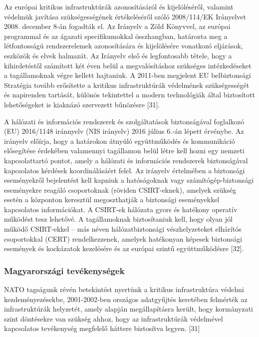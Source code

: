 \documentclass[12pt,magyar,a4paper,oneside]{scrreprt}
\begin{document}
Az európai kritikus infrastruktúrák azonosításáról és kijelöléséről,
valamint védelmük javítása szükségességének értékeléséről szóló
2008/114/EK Irányelvet 2008. december 8-án fogadták el. Az Irányelv a
Zöld Könyvvel, az európai programmal és az ágazati specifikumokkal
összhangban, határozta meg a létfontosságú rendszerelemek azonosítására
és kijelölésére vonatkozó eljárások, eszközök és elvek halmazát. Az
Irányelv első és legfontosabb tétele, hogy a kihirdetéstől számított két
éven belül a megvalósításhoz szükséges intézkedéseket a tagállamoknak
végre kellett hajtaniuk. A 2011-ben megjelent EU belbiztonsági Stratégia
tovább erősítette a kritikus infrastruktúrák védelmének szükségességét
és napirenden tartását, különös tekintettel a modern technológiák által
biztosított lehetőségeket is kiaknázó szervezett bűnözésre {[}31{]}.

A hálózati és információs rendszerek és szolgáltatások biztonságával
foglalkozó (EU) 2016/1148 iránnyelv (NIS irányelv) 2016 július 6.-án
lépett érvénybe. Az irányelv előírja, hogy a határokon átnyúló
együttműködés és kommunikáció elősegítése érdekében valamennyi
tagállamon belül létre kell hozni egy nemzeti kapcsolattartó pontot,
amely a hálózati és információs rendszerek biztonságával kapcsolatos
kérdések koordinálásáért felel. Az irányelv értelmében a biztonsági
eseményekről bejelentést kell kapniuk a hatóságoknak vagy
számítógép-biztonsági eseményekre reagáló csoportoknak (röviden
CSIRT-eknek), amelyek szükség esetén a központon keresztül megoszthatják
a biztonsági eseményekkel kapcsolatos információkat. A CSIRT-ek hálózata
gyors és hatékony operatív működést tesz lehetővé. A tagállamoknak
biztosítaniuk kell, hogy olyan jól működő CSIRT-ekkel -- más néven
hálózatbiztonsági vészhelyzeteket elhárítós csoportokkal (CERT)
rendelkezzenek, amelyek hatékonyan képesek biztonsági események és
kockázatok kezelésére és az európai szintű együttműködésre {[}32{]}.

\hypertarget{magyarorszuxe1gi-tevuxe9kenysuxe9gek}{%
\subsubsection{Magyarországi
tevékenységek}\label{magyarorszuxe1gi-tevuxe9kenysuxe9gek}}

NATO tagságunk révén betekintést nyertünk a kritikus infrastruktúra
védelmi kezdeményezésekbe, 2001-2002-ben országos adatgyűjtés keretében
felmérték az infrastruktúrák helyzetét, amely alapján megállapításra
került, hogy kormányzati szint döntésekre van szükség ahhoz, hogy az
infrastruktúrák védelmével kapcsolatos tevékenység megfelelő háttere
biztosítva legyen. {[}31{]}
\end{document}
